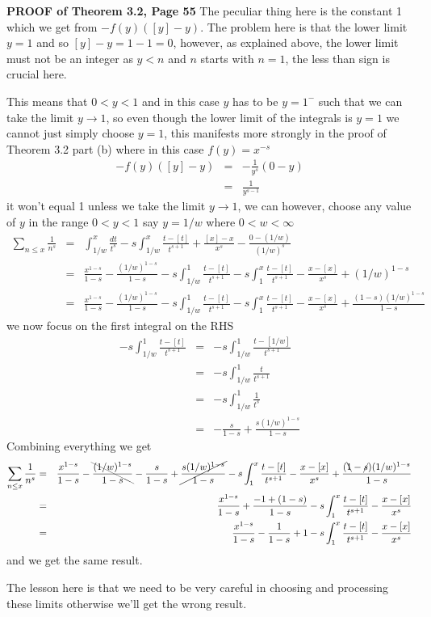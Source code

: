 \documentclass[aps,preprint,preprintnumbers,nofootinbib,showpacs,prd]{revtex4-1}
\newcommand{\nbea}{\begin{eqnarray*}}
\newcommand{\neea}{\end{eqnarray*}}
\begin{document}
{\bf PROOF of Theorem 3.2, Page 55} The peculiar thing here is the constant 1 which we get from $-f(y)([y]-y)$. The problem here is that the lower limit $y = 1$ and so $[y]-y = 1-1=0$, however, as explained above, the lower limit must not be an integer as $y < n$ and $n$ starts with $n=1$, the less than sign is crucial here.

This means that $0 < y < 1$ and in this case $y$ has to be $y = 1^{-}$ such that we can take the limit $y \to 1$, so even though the lower limit of the integrals is $y=1$ we cannot just simply choose $y=1$, this manifests more strongly in the proof of Theorem 3.2 part (b) where in this case $f(y) = x^{-s}$
%
\nbea
-f(y)([y]-y) & = & -\frac{1}{y^s} (0 - y) \\
& = & \frac{1}{y^{s-1}}
\neea
%
it won't equal 1 unless we take the limit $y \to 1$, we can however, choose any value of $y$ in the range $0 <y < 1$ say $y = 1/w$ where $0 < w < \infty$
%
\nbea
\sum_{n\le x} \frac{1}{n^s} & = & \int_{1/w}^x \frac{dt}{t^s} - s\int_{1/w}^x\frac{t-[t]}{t^{s+1}} + \frac{[x]-x}{x^s} - \frac{0 - (1/w)}{(1/w)^s} \\
& = & \frac{x^{1-s}}{1-s} - \frac{(1/w)^{1-s}}{1-s} - s\int_{1/w}^1\frac{t-[t]}{t^{s+1}} - s\int_{1}^x\frac{t-[t]}{t^{s+1}} - \frac{x-[x]}{x^s} + (1/w)^{1-s} \\
& = & \frac{x^{1-s}}{1-s} - \frac{(1/w)^{1-s}}{1-s} - s\int_{1/w}^1\frac{t-[t]}{t^{s+1}} - s\int_{1}^x\frac{t-[t]}{t^{s+1}} - \frac{x-[x]}{x^s} + \frac{(1-s)(1/w)^{1-s}}{1-s}
\neea
%
we now focus on the first integral on the RHS
%
\nbea
-s\int_{1/w}^1\frac{t-[t]}{t^{s+1}} & = & -s\int_{1/w}^1\frac{t-[1/w]}{t^{s+1}} \\
& = & -s\int_{1/w}^1\frac{t}{t^{s+1}} \\
& = & -s\int_{1/w}^1\frac{1}{t^{s}} \\
& = & -\frac{s}{1-s} + \frac{s (1/w)^{1-s}}{1-s}
\neea
%
Combining everything we get
%
\nbea
\sum_{n\le x} \frac{1}{n^s} & = & \frac{x^{1-s}}{1-s} - \bcancel{\frac{(1/w)^{1-s}}{1-s}} -\frac{s}{1-s} + \cancel{\frac{s(1/w)^{1-s}}{1-s}} - s\int_{1}^x\frac{t-[t]}{t^{s+1}} - \frac{x-[x]}{x^s} + \frac{(\bcancel{1}-\cancel{s})(1/w)^{1-s}}{1-s} \\
& = & \frac{x^{1-s}}{1-s} +\frac{-1 + (1 - s)}{1-s} - s\int_{1}^x\frac{t-[t]}{t^{s+1}} - \frac{x-[x]}{x^s} \\
& = & \frac{x^{1-s}}{1-s} - \frac{1}{1-s} + 1 - s\int_{1}^x\frac{t-[t]}{t^{s+1}} - \frac{x-[x]}{x^s}
\neea
%
and we get the same result.

The lesson here is that we need to be very careful in choosing and processing these limits otherwise we'll get the wrong result.
\end{document}
